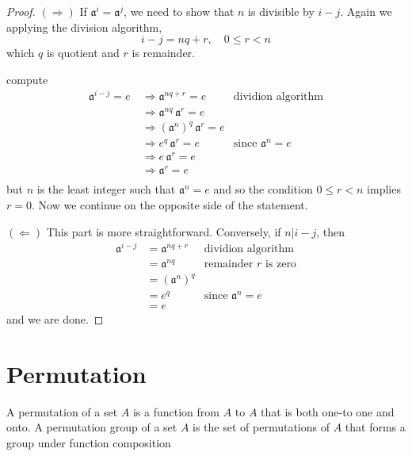 \begin{proof}
    $(\Rightarrow)$ If $\mathfrak{a}^i = \mathfrak{a}^j$, we need to show that $n$ is divisible by $i - j$. Again we 
    applying the division algorithm, 
    \[
        i - j = nq + r, \quad 0 \leq r < n
    \]
    which $q$ is quotient and $r$ is remainder.

    compute 
    \begin{align*}
        \mathfrak{a}^{i-j} = e \> &\Rightarrow \mathfrak{a}^{nq+r} = e & \text{dividion algorithm}\\
        &\Rightarrow \mathfrak{a}^{nq}\,  \mathfrak{a}^{r} = e\\
        &\Rightarrow (\mathfrak{a}^{n})^q \, \mathfrak{a}^{r} = e\\
        &\Rightarrow e^q \, \mathfrak{a}^{r} = e & \text{since } \mathfrak{a}^n = e\\
        &\Rightarrow e \, \mathfrak{a}^{r} = e\\
        &\Rightarrow \mathfrak{a}^{r} = e\\
    \end{align*}
    but $n$ is the least integer such that $\mathfrak{a}^n = e$ and so the condition $0 \leq r < n$ implies 
    $r = 0$. Now we continue on the opposite side of the statement.

    $(\Leftarrow)$ This part is more straightforward. Conversely, if $n|i-j$, then 
    \begin{align*}
        \mathfrak{a}^{i-j} &= \mathfrak{a}^{nq+r} & \text{dividion algorithm}\\ 
        &= \mathfrak{a}^{nq} & \text{remainder } r \text{ is zero}\\ 
        &= (\mathfrak{a}^n)^q\\
        &= e^q & \text{since } \mathfrak{a}^n = e\\
        &= e
    \end{align*}
    and we are done.
\end{proof}

\section{Permutation}

\begin{definition}
    A permutation of a set $A$ is a function from $A$ to $A$ that is both one-to
one and onto. A permutation group of a set $A$ is the set of permutations of $A$ that 
forms a group under function composition
\end{definition}

